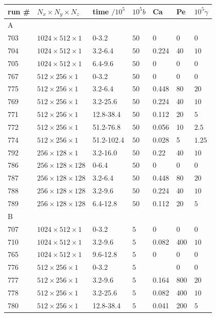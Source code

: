 \documentclass[8.5pt,twoside,twocolumn]{article}
\begin{document}
\begin{table}[htp]
\small
\begin{tabular*}{0.52\textwidth}{l|l|l|l|l|l|l}
\hline
run \# & $N_x\times N_y\times N_z$ & time $/10^5$ & $10^5b$ & Ca & Pe & $10^5\dot\gamma$\\
\hline
A & & & & & &\\
\hline 
703 & $1024\times512\times1$ & 0-3.2 & $50$ &0 &0 & 0 \\
704 & $1024\times512\times1$ & 3.2-6.4& $50$ & 0.224 & 40 &  $10$\\
705 & $1024\times512\times1$ & 6.4-9.6& $50$ &0 & 0 &  0 \\
\hline
767 & $512\times256\times1$ & 0-3.2 & $50$ &0 & 0 &  0\\
775 & $512\times256\times1$ & 3.2-6.4& $50$ &0.448 & 80 &  $20$ \\
769 & $512\times256\times1$ & 3.2-25.6& $50$ &0.224 & 40 &  $10$ \\
771 & $512\times256\times1$ & 12.8-38.4& $50$ &0.112 & 20 &  $ 5$ \\
772 & $512\times256\times1$ & 51.2-76.8& $50$ &0.056 & 10 &  $ 2.5$ \\
774 & $512\times256\times1$ & 51.2-102.4& $50$ &0.028 & 5 &  $1.25$ \\
\hline
792 & $256\times128\times1$ & 3.2-16.0& $50$ &0.22 & 40 &  $10$ \\
\hline
786 & $256\times128\times128$ & 0-6.4 & $50$ &0 & 0 &  0\\
787 & $256\times128\times128$ & 3.2-6.4 & $50$ &0.448 & 80 &  $20$\\
788 & $256\times128\times128$ & 3.2-9.6 & $50$ &0.224 & 40 &  $10$\\
789 & $256\times128\times128$ & 6.4-12.8 & $50$ &0.112 & 20 &  $5$\\
\hline
B & & & & & &\\
\hline
707 & $1024\times512\times1$ & 0-3.2 & $5$ &0 & 0 &  0 \\
710 & $1024\times512\times1$ & 3.2-9.6& $5$ &0.082 & 400 &  $10$ \\
765 & $1024\times512\times1$ & 9.6-12.8& $5$ &0 & 0 &  0 \\
\hline
776 & $512\times256\times1$ & 0-3.2 & $5$ & & 0 &  0 \\
777 & $512\times256\times1$ & 3.2-9.6& $5$ &0.164 & 800 &  $20$ \\
778 & $512\times256\times1$ & 3.2-25.6& $5$ &0.082 & 400 &  $10$ \\
780 & $512\times256\times1$ & 12.8-38.4& $5$ &0.041 & 200 &  $5$ \\

\end{tabular*}
\end{table}
\end{document}
